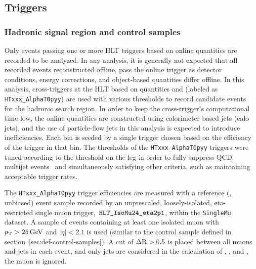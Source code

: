 \subsection{Triggers}

\subsubsection{Hadronic signal region and control samples\label{sec:signal_triggers}} 

Only events passing one or more HLT triggers based on online quantities 
are recorded to be analyzed. In any analysis, it is generally not expected 
that all recorded events reconstructed offline, pass the online 
trigger as detector conditions, energy corrections, and object-based quantities
differ offline. In this analysis, cross-triggers at the HLT
based on quantities \scalht and \alphat (labeled as \verb!HTxxx_AlphaT0pyy!) 
are used with various thresholds to record candidate events for the hadronic search
region. In order to keep the cross-trigger's computational time low, the online quantities
are constructed using calorimeter based jets (calo jets), and the use of
particle-flow jets in this analysis is expected to introduce inefficiencies.
Each \scalht bin is seeded by a single trigger chosen based on the
efficiency of the trigger in that \scalht bin. The \alphat thresholds of the
\verb!HTxxx_AlphaT0pyy! triggers were tuned according to the threshold
on the \scalht leg in order to fully suppress QCD multijet events~\cite{RA1Paper2012}
and simultaneously satisfying other criteria, such as maintaining
acceptable trigger rates.

The \verb!HTxxx_AlphaT0pyy! trigger efficiencies are measured with a
reference (\ie, unbiased) event sample recorded by an unprescaled,
loosely-isolated, eta-restricted single muon trigger,$\,$      $\verb!HLT_IsoMu24_eta2p1!$,
within the \verb!SingleMu! dataset. A sample of events containing at 
least one isolated muon with $p_{\mathrm{T}} > 25\,\text{Ge\hspace{-.08em}V}$ and $|\eta| < 2.1$ is used 
(similar to the \mj control sample defined in 
section~\ref{sec:def-control-samples}). A cut of $\Delta
{\rm R} > 0.5$ is placed between all muons and jets in each event, and
only jets are considered in the calculation of \scalht, \mht, and
\alphat, \ie the muon is ignored.

